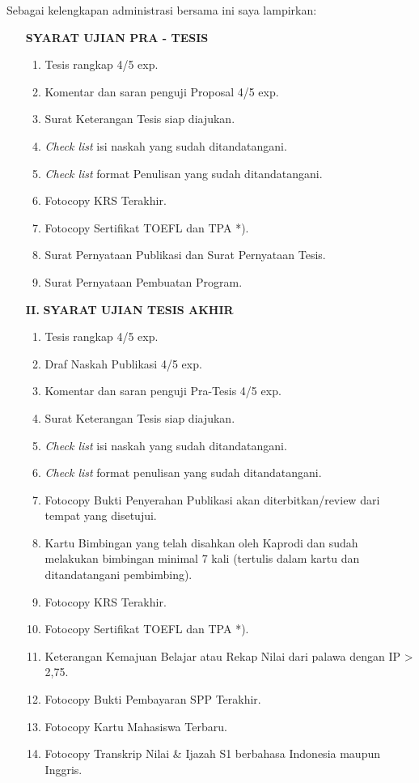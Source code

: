 \vspace{.2cm}
\noindent
Sebagai kelengkapan administrasi bersama ini saya lampirkan:
\begin{enumerate}
	\item[\textbf{\circled{I.}}] \textbf{SYARAT UJIAN PRA - TESIS}
	\begin{enumerate}
		\setlength\itemsep{0.1mm}
		\item Tesis rangkap 4/5 exp.
		\item Komentar dan saran penguji Proposal 4/5 exp.
		\item Surat Keterangan Tesis siap diajukan.
		\item \textit{Check list} isi naskah yang sudah ditandatangani.
		\item \textit{Check list} format Penulisan yang sudah ditandatangani.
		\item Fotocopy KRS Terakhir.
		\item Fotocopy Sertifikat TOEFL dan TPA *).
		\item Surat Pernyataan Publikasi dan Surat Pernyataan Tesis.
		\item Surat Pernyataan Pembuatan Program.
	\end{enumerate}
	\item[\textbf{II.}] \textbf{SYARAT UJIAN TESIS AKHIR}
	\begin{enumerate}
		\setlength\itemsep{0.1mm}
		\item Tesis rangkap 4/5 exp.
		\item Draf Naskah Publikasi 4/5 exp.
		\item Komentar dan saran penguji Pra-Tesis 4/5 exp.
		\item Surat Keterangan Tesis siap diajukan.
		\item \textit{Check list} isi naskah yang sudah ditandatangani.
		\item \textit{Check list} format penulisan yang sudah ditandatangani.
		\item Fotocopy Bukti Penyerahan Publikasi akan diterbitkan/review dari tempat yang disetujui.
		\item Kartu Bimbingan yang telah disahkan oleh Kaprodi dan sudah melakukan bimbingan minimal 7 kali (tertulis dalam kartu dan ditandatangani pembimbing).
		\item Fotocopy KRS Terakhir.
		\item Fotocopy Sertifikat TOEFL dan TPA *).
		\item Keterangan Kemajuan Belajar atau Rekap Nilai dari palawa dengan  IP > 2,75.
		\item Fotocopy Bukti Pembayaran SPP Terakhir.
		\item Fotocopy Kartu Mahasiswa Terbaru.
		\item Fotocopy Transkrip Nilai \& Ijazah S1 berbahasa Indonesia maupun Inggris.
	\end{enumerate}
\end{enumerate}

